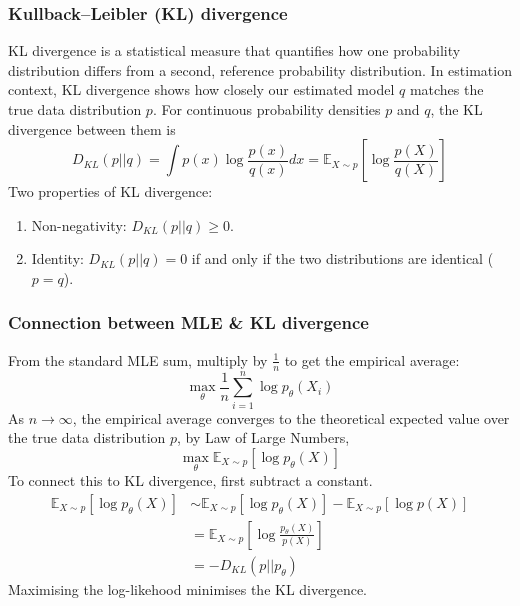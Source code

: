 \documentclass[../Probability.tex]{subfiles}
\begin{document}
\subsubsection{Kullback–Leibler (KL) divergence}
KL divergence is a statistical measure that quantifies how one probability distribution differs from a second, reference probability distribution.\newline
In estimation context, KL divergence shows how closely our estimated model $q$ matches the true data distribution $p$.\newline
For continuous probability densities $p$ and $q$, the KL divergence between them is
\[D_{KL}(p||q) = \int p(x) \log \frac{p(x)}{q(x)} dx = \mathbb{E}_{X \sim p} \left[ \log \frac{p(X)}{q(X)} \right]\]
Two properties of KL divergence:
\begin{enumerate}
    \item Non-negativity: $D_{KL}(p||q) \ge 0$.
    \item Identity: $D_{KL}(p||q) = 0$ if and only if the two distributions are identical ($p = q$).
\end{enumerate}

\subsubsection{Connection between MLE \& KL divergence}
From the standard MLE sum, multiply by $\frac{1}{n}$ to get the empirical average:
$$\max_{\theta} \frac{1}{n} \sum_{i=1}^{n} \log p_{\theta}(X_{i})$$
As $n \to \infty$, the empirical average converges to the theoretical expected value over the true data distribution $p$, by Law of Large Numbers,
$$\max_{\theta} \mathbb{E}_{X \sim p}[\log p_{\theta}(X)]$$
To connect this to KL divergence, first subtract a constant.
\begin{align*}
    \mathbb{E}_{X \sim p}[\log p_{\theta}(X)] &\sim \mathbb{E}_{X \sim p}[\log p_{\theta}(X)] - \mathbb{E}_{X \sim p}[\log p(X)] \\
    &= \mathbb{E}_{X \sim p}\left[ \log \frac{p_{\theta}(X)}{p(X)} \right] \\
    &= -D_{KL}(p || p_{\theta})
\end{align*}
Maximising the log-likehood minimises the KL divergence.
\end{document}
